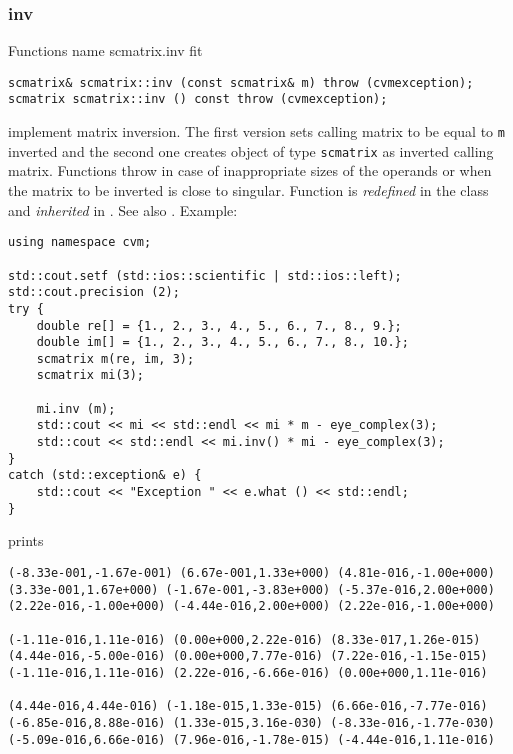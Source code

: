 \subsubsection{inv}
Functions%
\pdfdest name {scmatrix.inv} fit
\begin{verbatim}
scmatrix& scmatrix::inv (const scmatrix& m) throw (cvmexception);
scmatrix scmatrix::inv () const throw (cvmexception);
\end{verbatim}
implement matrix inversion.
The first version sets  calling matrix to be equal to 
\verb"m" inverted and the second one
creates  object of type \verb"scmatrix" as inverted calling matrix.
Functions throw   
in case of inappropriate
sizes of the operands or when the matrix to be inverted is close to
singular.
Function is \emph{redefined} in the class
and \emph{inherited} in .
See also
.
Example:
\begin{Verbatim}
using namespace cvm;

std::cout.setf (std::ios::scientific | std::ios::left); 
std::cout.precision (2);
try {
    double re[] = {1., 2., 3., 4., 5., 6., 7., 8., 9.};
    double im[] = {1., 2., 3., 4., 5., 6., 7., 8., 10.};
    scmatrix m(re, im, 3);
    scmatrix mi(3);

    mi.inv (m);
    std::cout << mi << std::endl << mi * m - eye_complex(3);
    std::cout << std::endl << mi.inv() * mi - eye_complex(3);
}
catch (std::exception& e) {
    std::cout << "Exception " << e.what () << std::endl;
}
\end{Verbatim}
prints
\begin{Verbatim}
(-8.33e-001,-1.67e-001) (6.67e-001,1.33e+000) (4.81e-016,-1.00e+000)
(3.33e-001,1.67e+000) (-1.67e-001,-3.83e+000) (-5.37e-016,2.00e+000)
(2.22e-016,-1.00e+000) (-4.44e-016,2.00e+000) (2.22e-016,-1.00e+000)

(-1.11e-016,1.11e-016) (0.00e+000,2.22e-016) (8.33e-017,1.26e-015)
(4.44e-016,-5.00e-016) (0.00e+000,7.77e-016) (7.22e-016,-1.15e-015)
(-1.11e-016,1.11e-016) (2.22e-016,-6.66e-016) (0.00e+000,1.11e-016)

(4.44e-016,4.44e-016) (-1.18e-015,1.33e-015) (6.66e-016,-7.77e-016)
(-6.85e-016,8.88e-016) (1.33e-015,3.16e-030) (-8.33e-016,-1.77e-030)
(-5.09e-016,6.66e-016) (7.96e-016,-1.78e-015) (-4.44e-016,1.11e-016)
\end{Verbatim}
\newpage




